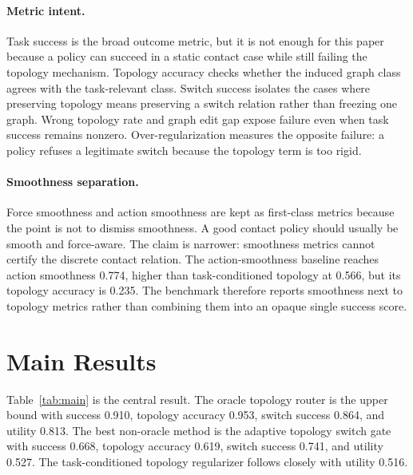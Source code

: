 \documentclass{article}
\begin{document}
\paragraph{Metric intent.}
Task success is the broad outcome metric, but it is not enough for this paper because a policy can succeed in a static contact case while still failing the topology mechanism. Topology accuracy checks whether the induced graph class agrees with the task-relevant class. Switch success isolates the cases where preserving topology means preserving a switch relation rather than freezing one graph. Wrong topology rate and graph edit gap expose failure even when task success remains nonzero. Over-regularization measures the opposite failure: a policy refuses a legitimate switch because the topology term is too rigid.

\paragraph{Smoothness separation.}
Force smoothness and action smoothness are kept as first-class metrics because the point is not to dismiss smoothness. A good contact policy should usually be smooth and force-aware. The claim is narrower: smoothness metrics cannot certify the discrete contact relation. The action-smoothness baseline reaches action smoothness 0.774, higher than task-conditioned topology at 0.566, but its topology accuracy is 0.235. The benchmark therefore reports smoothness next to topology metrics rather than combining them into an opaque single success score.

\section{Main Results}

\begin{table}[t]
\centering
\small
\resizebox{\linewidth}{!}{}
\caption{Main policy comparison. Smoothness alone has high action smoothness but weak topology accuracy; adaptive and task-conditioned topology policies are the strongest non-oracle methods.}
\label{tab:main}
\end{table}

Table~\ref{tab:main} is the central result. The oracle topology router is the upper bound with success 0.910, topology accuracy 0.953, switch success 0.864, and utility 0.813. The best non-oracle method is the adaptive topology switch gate with success 0.668, topology accuracy 0.619, switch success 0.741, and utility 0.527. The task-conditioned topology regularizer follows closely with utility 0.516.
\end{document}
